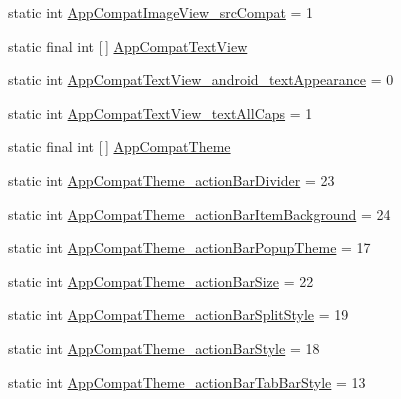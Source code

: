 \begin{DoxyCompactItemize}
static int \hyperlink{classandroid_1_1support_1_1v7_1_1mediarouter_1_1R_1_1styleable_a71ebb568ec6b94514a7c9cdcace4bbbd}{App\+Compat\+Image\+View\+\_\+src\+Compat} = 1
\item 
static final int \mbox{[}$\,$\mbox{]} \hyperlink{classandroid_1_1support_1_1v7_1_1mediarouter_1_1R_1_1styleable_a0c5a7d15ad417c65366ead3c4e4a2b25}{App\+Compat\+Text\+View}
\item 
static int \hyperlink{classandroid_1_1support_1_1v7_1_1mediarouter_1_1R_1_1styleable_a48337a5c6a8f6cfe43df3b40d1756018}{App\+Compat\+Text\+View\+\_\+android\+\_\+text\+Appearance} = 0
\item 
static int \hyperlink{classandroid_1_1support_1_1v7_1_1mediarouter_1_1R_1_1styleable_a158abba218ddea699db0d0ec5c5595f1}{App\+Compat\+Text\+View\+\_\+text\+All\+Caps} = 1
\item 
static final int \mbox{[}$\,$\mbox{]} \hyperlink{classandroid_1_1support_1_1v7_1_1mediarouter_1_1R_1_1styleable_a4e3d3900c75d49aeb2f283cac00214d6}{App\+Compat\+Theme}
\item 
static int \hyperlink{classandroid_1_1support_1_1v7_1_1mediarouter_1_1R_1_1styleable_a6ca0030f0c9be330422f3f56c9118802}{App\+Compat\+Theme\+\_\+action\+Bar\+Divider} = 23
\item 
static int \hyperlink{classandroid_1_1support_1_1v7_1_1mediarouter_1_1R_1_1styleable_a90c427e103e51830dfc3b0742ec37ff4}{App\+Compat\+Theme\+\_\+action\+Bar\+Item\+Background} = 24
\item 
static int \hyperlink{classandroid_1_1support_1_1v7_1_1mediarouter_1_1R_1_1styleable_af1394a44da974408e6b670d517a5c780}{App\+Compat\+Theme\+\_\+action\+Bar\+Popup\+Theme} = 17
\item 
static int \hyperlink{classandroid_1_1support_1_1v7_1_1mediarouter_1_1R_1_1styleable_a5c243aa267f830337d4803475264a5dc}{App\+Compat\+Theme\+\_\+action\+Bar\+Size} = 22
\item 
static int \hyperlink{classandroid_1_1support_1_1v7_1_1mediarouter_1_1R_1_1styleable_a7a7aca24fc568f1643e2776667ac41ba}{App\+Compat\+Theme\+\_\+action\+Bar\+Split\+Style} = 19
\item 
static int \hyperlink{classandroid_1_1support_1_1v7_1_1mediarouter_1_1R_1_1styleable_a24d210b595f7652ac59fe60ecb3e5550}{App\+Compat\+Theme\+\_\+action\+Bar\+Style} = 18
\item 
static int \hyperlink{classandroid_1_1support_1_1v7_1_1mediarouter_1_1R_1_1styleable_af1dbff66a310e66d54936e5a64a53920}{App\+Compat\+Theme\+\_\+action\+Bar\+Tab\+Bar\+Style} = 13
\item 

\end{DoxyCompactItemize}
